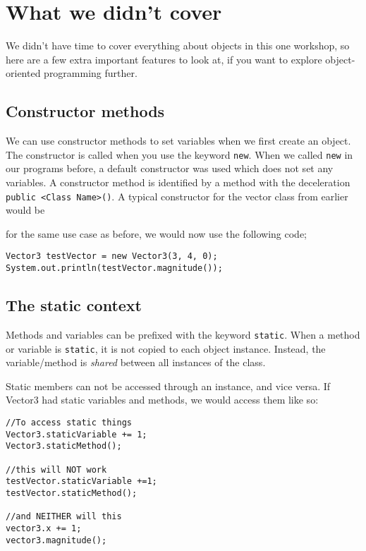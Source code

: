 \webclearpage
\section{What we didn't cover}

	We didn't have time to cover everything about objects in this one workshop, so here are a few extra important features to look at, if you want to explore object-oriented programming further.
	
	\ifprint
	\else
		
		\subsection*{Constructor methods}
		
			We can use constructor methods to set variables when we first create an object.
			\ifprint\else The constructor is called when you use the keyword \texttt{new}. When we called \texttt{new} in our programs before, a default constructor was used which does not set any variables.\fi		
			A constructor method is identified by a method with the deceleration \texttt{public <Class Name>()}. A typical constructor for the vector class from earlier would be
			
			
			
			for the same use case as before, we would now use the following code;
			
			\begin{lstlisting}[style=Java, numbers=none]
Vector3 testVector = new Vector3(3, 4, 0);
System.out.println(testVector.magnitude());
			\end{lstlisting}
			
		\subsection*{The static context}
		
			Methods and variables can be prefixed with the keyword \texttt{static}. When a method or variable is \texttt{static}, it is not copied to each object instance. Instead, the variable/method is \textit{shared} between all instances of the class. 
			
			Static members can not be accessed through an instance, and vice versa. If Vector3 had static variables and methods, we would access them like so:
			
			\begin{lstlisting}[style=Java, numbers=none]
//To access static things
Vector3.staticVariable += 1;
Vector3.staticMethod();
	
//this will NOT work
testVector.staticVariable +=1;
testVector.staticMethod();
	
//and NEITHER will this
vector3.x += 1;
vector3.magnitude();
			\end{lstlisting}
			
